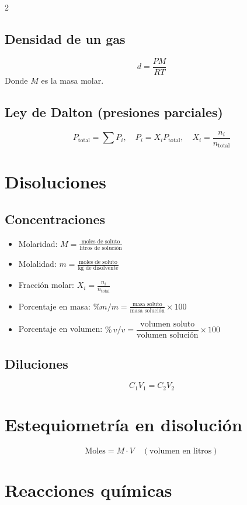 \documentclass[12pt]{article}
\begin{document}
\begin{multicols}{2}
\subsection*{Densidad de un gas}
\[
d = \frac{PM}{RT}
\]
Donde $M$ es la masa molar.

\subsection*{Ley de Dalton (presiones parciales)}
\[
P_{\text{total}} = \sum P_i, \quad P_i = X_i P_{\text{total}}, \quad X_i = \frac{n_i}{n_{\text{total}}}
\]

\section*{Disoluciones}
\subsection*{Concentraciones}
\begin{itemize}[leftmargin=*]
    \item Molaridad: $M = \frac{\text{moles de soluto}}{\text{litros de solución}}$
    \item Molalidad: $m = \frac{\text{moles de soluto}}{\text{kg de disolvente}}$
    \item Fracción molar: $X_i = \frac{n_i}{n_{\text{total}}}$
    \item Porcentaje en masa: $\% m/m = \frac{\text{masa soluto}}{\text{masa solución}} \times 100$
    \item Porcentaje en volumen: $\%\,v/v = \dfrac{\text{volumen soluto}}{\text{volumen solución}} \times 100$

\end{itemize}

\subsection*{Diluciones}
\[
C_1V_1 = C_2V_2
\]

\section*{Estequiometría en disolución}
\[
\text{Moles} = M \cdot V \quad (\text{volumen en litros})
\]

\section*{Reacciones químicas}

\end{multicols}
\end{document}
